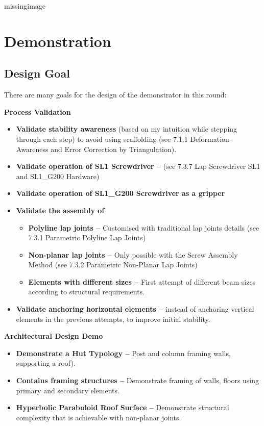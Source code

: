 missingimage

\section{Demonstration}
\label{section:exploration_4_demonstration}

\subsection{Design Goal}
\label{subsection:exploration_4_design_goal}

There are many goals for the design of the demonstrator in this round:

\textbf{Process Validation}
\begin{itemize}
    \item \textbf{Validate stability awareness} (based on my intuition while stepping through each step) to avoid using scaffolding (see 7.1.1 Deformation-Awareness and Error Correction by Triangulation).
    \item \textbf{Validate operation of SL1 Screwdriver --} (see 7.3.7 Lap Screwdriver SL1 and SL1\_G200 Hardware)
    \item \textbf{Validate operation of SL1\_G200 Screwdriver as a gripper}
    \item \textbf{Validate the assembly of}
    \begin{itemize}
        \item \textbf{Polyline lap joints --} Customised with traditional lap joints details (see 7.3.1 Parametric Polyline Lap Joints)
        \item \textbf{Non-planar lap joints --} Only possible with the Screw Assembly Method (see 7.3.2 Parametric Non-Planar Lap Joints)
        \item \textbf{Elements with different sizes --} First attempt of different beam sizes according to structural requirements.
    \end{itemize}
    \item \textbf{Validate anchoring horizontal elements --} instead of anchoring vertical elements in the previous attempts, to improve initial stability.
\end{itemize}
\textbf{Architectural Design Demo}
\begin{itemize}
    \item \textbf{Demonstrate a Hut Typology --} Post and column framing walls, supporting a roof).
    \item \textbf{Contains framing structures --} Demonstrate framing of walls, floors using primary and secondary elements.
    \item \textbf{Hyperbolic Paraboloid Roof Surface --} Demonstrate structural complexity that is achievable with non-planar joints.
\end{itemize}

